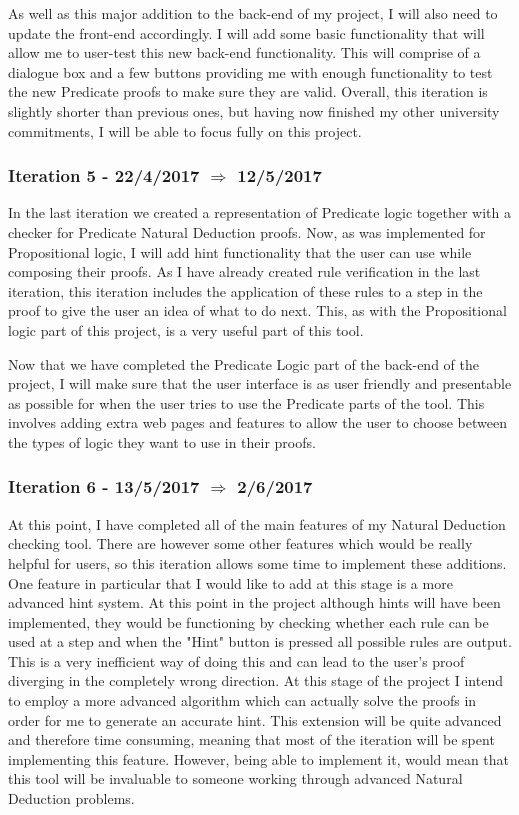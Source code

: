 As well as this major addition to the back-end of my project, I will also need to update the front-end accordingly. I will add some basic functionality that will allow me to user-test this new back-end functionality. This will comprise of a dialogue box and a few buttons providing me  with enough functionality to test the new Predicate proofs to make sure they are valid. Overall, this iteration is slightly shorter than previous ones, but having now finished my other university commitments, I will be able to focus fully on this project. 

\subsubsection{Iteration 5 - 22/4/2017 $\Rightarrow$ 12/5/2017}

In the last iteration we created a representation of Predicate logic together with a checker for Predicate Natural Deduction proofs. Now, as was implemented for Propositional logic, I will add hint functionality that the user can use while composing their proofs. As I have already created rule verification in the last iteration, this iteration includes the application of these rules to a step in the proof to give the user an idea of what to do next. This, as with the Propositional logic part of this project, is a very useful part of this tool. 

Now that we have completed the Predicate Logic part of the back-end of the project, I will make sure that the user interface is as user friendly and presentable as possible for when the user tries to use the Predicate parts of the tool. This involves adding extra web pages and features to allow the user to choose between the types of logic they want to use in their proofs.

\subsubsection{Iteration 6 - 13/5/2017 $\Rightarrow$ 2/6/2017}

At this point, I have completed all of the main features of my Natural Deduction checking tool. There are however some other features which would be really helpful for users, so this iteration allows some time to implement these additions. One feature in particular that I would like to add at this stage is a more advanced hint system. At this point in the project although hints will have been implemented, they would be functioning by checking whether each rule can be used at a step and when the "Hint" button is pressed all possible rules are output. This is a very inefficient way of doing this and can lead to the user's proof diverging in the completely wrong direction. At this stage of the project I intend to employ a more advanced algorithm which can actually solve the proofs in order for me to generate an accurate hint. This extension will be quite advanced and therefore time consuming, meaning that most of the iteration will be spent implementing this feature. However, being able to implement it, would mean that this tool will be invaluable to someone working through advanced Natural Deduction problems.

